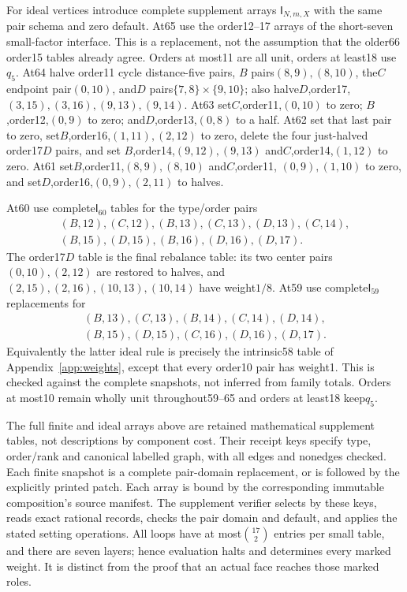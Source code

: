 \documentclass[11pt]{article}
\theoremstyle{remark}\newtheorem{remark}[theorem]{Remark}
\begin{document}
For ideal vertices introduce complete supplement arrays
$\mathsf I_{N,m,X}$ with the same pair schema and zero default.
At65 use the order12--17 arrays of the short-seven small-factor
interface. This is a replacement, not the assumption that the
older66 order15 tables already agree. Orders at most11 are all
unit, orders at least18 use$q_5$. At64 halve order11 cycle
distance-five pairs, $B$ pairs$(8,9),(8,10)$, the$C$ endpoint
pair$(0,10)$, and$D$ pairs$\{7,8\}\times\{9,10\}$;
also halve$D$,order17,$(3,15),(3,16),(9,13),(9,14)$.
At63 set$C$,order11,$(0,10)$ to zero; $B$,order12,$(0,9)$
to zero; and$D$,order13,$(0,8)$ to a half.
At62 set that last pair to zero, set$B$,order16,$(1,11),(2,12)$
to zero, delete the four just-halved order17$D$ pairs, and set
$B$,order14,$(9,12),(9,13)$ and$C$,order14,$(1,12)$ to zero.
At61 set$B$,order11,$(8,9),(8,10)$ and$C$,order11,
$(0,9),(1,10)$ to zero, and set$D$,order16,$(0,9),(2,11)$
to halves.

At60 use complete$\mathsf I_{60}$ tables for the type/order pairs
\[
\begin{gathered}
(B,12),(C,12),(B,13),(C,13),(D,13),(C,14),\\
(B,15),(D,15),(B,16),(D,16),(D,17).
\end{gathered}
\]
The order17$D$ table is the final rebalance table: its two center
pairs$(0,10),(2,12)$ are restored to halves, and
$(2,15),(2,16),(10,13),(10,14)$ have weight$1/8$.
At59 use complete$\mathsf I_{59}$ replacements for
\[
\begin{gathered}
(B,13),(C,13),(B,14),(C,14),(D,14),\\
(B,15),(D,15),(C,16),(D,16),(D,17).
\end{gathered}
\]
Equivalently the latter ideal rule is precisely the intrinsic58
table of Appendix~\ref{app:weights}, except that every order10
pair has weight1. This is checked against the complete snapshots,
not inferred from family totals. Orders at most10 remain wholly
unit throughout59--65 and orders at least18 keep$q_5$.

The full finite and ideal arrays above are retained mathematical
supplement tables, not descriptions by component cost. Their receipt
keys specify type, order/rank and canonical labelled graph, with all
edges and nonedges checked. Each finite snapshot is a complete
pair-domain replacement, or is followed by the explicitly printed
patch. Each array is bound by the corresponding immutable
composition's source manifest. The supplement verifier selects by
these keys, reads exact rational records, checks the pair domain and
default, and applies the stated setting operations. All loops have
at most$\binom{17}{2}$ entries per small table, and there are seven
layers; hence evaluation halts and determines every marked weight.
It is distinct from the proof that an actual face reaches those
marked roles.
\end{document}
